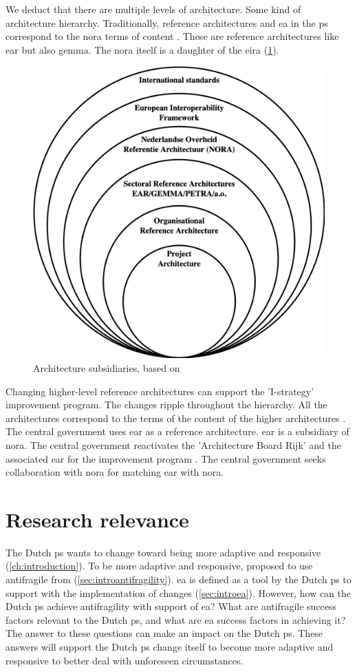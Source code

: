 We deduct that there are multiple levels of architecture. Some kind of architecture hierarchy. Traditionally, reference architectures and \gls{ea} in the \gls{ps} correspond to the \acrshort{nora} terms of content \parencite{NORAfamilie}. These are reference architectures like \acrshort{ear} but also \acrfull{gemma}. The \acrshort{nora} itself is a daughter of the \acrfull{eira} (\cref{fig:architectureviewonion}).
\begin{figure}[H]
	\centering
	\includegraphics[width=0.5\linewidth]{images/architectureviewonion}
	\caption[Architecture subsidiaries, based on \textcite{Greefhorst2008}]{Architecture subsidiaries, based on \textcite{Greefhorst2008}}
	\label{fig:architectureviewonion}
\end{figure}
Changing higher-level reference architectures can support the 'I-strategy' improvement program. The changes ripple throughout the hierarchy. All the architectures correspond to the terms of the content of the higher architectures \parencite{NORAfamilie}. The central government uses \acrshort{ear} as a reference architecture. \acrshort{ear} is a subsidiary of \acrshort{nora}. The central government reactivates the 'Architecture Board Rijk' and the associated \acrshort{ear} for the improvement program \parencite[p.~42]{Digitaleoverheid2021}. The central government seeks collaboration with \acrshort{nora} for matching \acrshort{ear} with \acrshort{nora}.

\section{Research relevance}
\label{sec:researchrelevance}
The Dutch \gls{ps} wants to change toward being more adaptive and responsive (\cref{ch:introduction}). To be more adaptive and responsive, \textcite{Steen2018} proposed to use \gls{antifragile} from \textcite{Taleb2012} (\cref{sec:introantifragility}). \gls{ea} is defined as a tool by the Dutch \gls{ps} to support with the implementation of changes (\cref{sec:introea}). However, how can the Dutch \gls{ps} achieve \gls{antifragility} with support of \gls{ea}? What are \gls{antifragile} success factors relevant to the Dutch \gls{ps}, and what are \gls{ea} success factors in achieving it? The answer to these questions can make an impact on the Dutch \gls{ps}. These answers will support the Dutch \gls{ps} change itself to become more adaptive and responsive to better deal with unforeseen circumstances.

